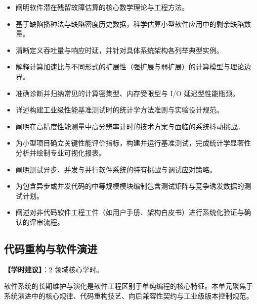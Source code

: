 \begin{itemize}
    \item 阐明软件潜在残留故障估算的核心数学理论与工程方法。
    \item 基于缺陷播种法与缺陷密度历史数据，科学估算小型软件应用中的剩余缺陷数量。
    \item 清晰定义吞吐量与响应时延，并针对具体系统架构各列举典型实例。
    \item 解释计算加速比与不同形式的扩展性（强扩展与弱扩展）的计算模型与理论边界。
    \item 准确诊断并归纳常见的计算密集型、内存受限型与 I/O 延迟型性能瓶颈。
    \item 详述构建工业级性能基准测试时的统计学方法准则与实验设计规范。
    \item 阐明在高精度性能测量中高分辨率计时的技术方案与面临的系统抖动挑战。
    \item 为小型项目确立关键性能评价指标，构建并运行基准测试，完成统计学显著性分析并绘制专业可视化报表。
    \item 阐明测试异步、并发与并行软件系统的特有挑战与调试应对策略。
    \item 为包含异步或并发代码的中等规模模块编制包含测试矩阵与竞争诱发数据的测试计划。
    \item 阐述对非代码软件工程工件（如用户手册、架构白皮书）进行系统化验证与确认的评审流程。
\end{itemize}

\subsection{代码重构与软件演进}
\textbf{【学时建议】}：2 领域核心学时。

软件系统的长期维护与演化是软件工程区别于单纯编程的核心特征。本单元聚焦于系统演进中的核心规律、代码重构技艺、向后兼容性契约与工业级版本控制规范。

